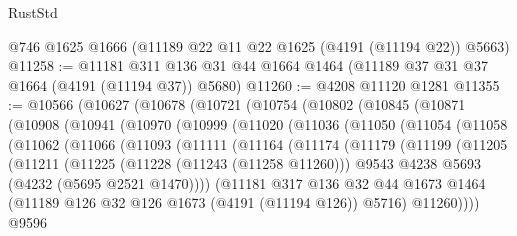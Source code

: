 \begin{lexlean}{RustStd}
\begin{coremodule}
    @746
    @1625
    @1666
    (@11189 @22 @11 @22 @1625 (@4191 (@11194 @22)) @5663)
@11258 := @11181 @311 @136 @31 @44 @1664 @1464 (@11189 @37 @31 @37 @1664 (@4191 (@11194 @37)) @5680)
@11260 := @4208 @11120 @1281
@11355 := @10566
    (@10627
      (@10678
        (@10721
          (@10754
            (@10802
              (@10845
                (@10871
                  (@10908
                    (@10941
                      (@10970
                        (@10999
                          (@11020
                            (@11036
                              (@11050
                                (@11054
                                  (@11058
                                    (@11062
                                      (@11066
                                        (@11093
                                          (@11111
                                            (@11164
                                              (@11174
                                                (@11179
                                                  (@11199
                                                    (@11205
                                                      (@11211
                                                        (@11225
                                                          (@11228 (@11243 (@11258 @11260)))
                                                          @9543
                                                          @4238
                                                          @5693
                                                          (@4232 (@5695 @2521 @1470))))
                                                      (@11181
                                                        @317
                                                        @136
                                                        @32
                                                        @44
                                                        @1673
                                                        @1464
                                                        (@11189
                                                          @126
                                                          @32
                                                          @126
                                                          @1673
                                                          (@4191 (@11194 @126))
                                                          @5716)
                                                        @11260))))
                                                @9596

\end{coremodule}
\end{lexlean}
